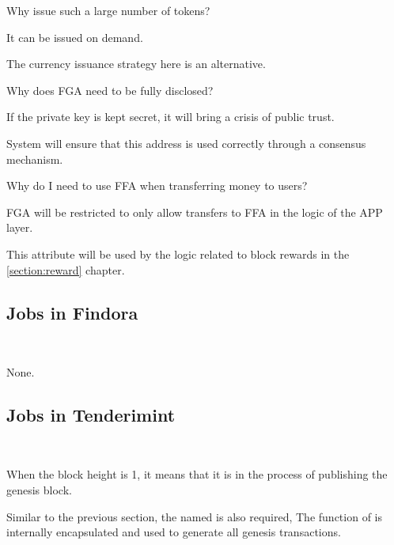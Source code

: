 \begin{ENUMERATE}
    \item Why issue such a large number of tokens?
    \begin{ITEMIZE}
        \item It can be issued on demand.
        \item The currency issuance strategy here is an alternative.
    \end{ITEMIZE}
    \item Why does FGA need to be fully disclosed?
    \begin{ITEMIZE}
        \item If the private key is kept secret, it will bring a crisis of public trust.
        \item System will ensure that this address is used correctly through a consensus mechanism.
    \end{ITEMIZE}
    \item Why do I need to use FFA when transferring money to users?
    \begin{ITEMIZE}
        \item FGA will be restricted to only allow transfers to FFA in the logic of the APP layer.
        \item This attribute will be used by the logic related to block rewards in the \ref{section:reward} chapter.
    \end{ITEMIZE}
\end{ENUMERATE}

\subsection{Jobs in Findora}

~\par

None.

\clearpage

\subsection{Jobs in Tenderimint}

~\par

When the block height is 1, it means that it is in the process of publishing the genesis block.

Similar to the previous section, the  named  is also required,
The function of  is internally encapsulated and used to generate all genesis transactions.

